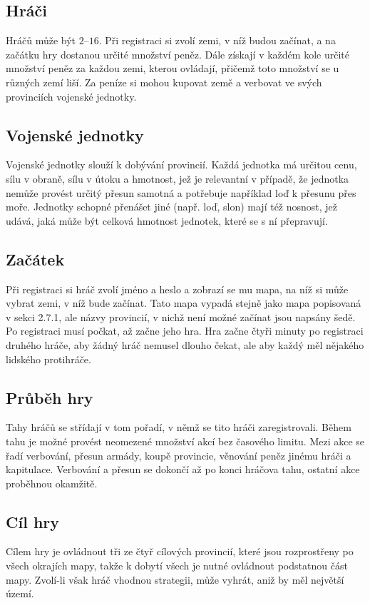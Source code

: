 \documentclass[a4paper,12pt]{article}
\begin{document}
\subsection{Hráči}
Hráčů může být $2$--$16$. Při registraci si zvolí zemi, v níž budou začínat, a na začátku hry dostanou určité množství peněz. Dále získají v každém kole určité množství peněz za každou zemi, kterou ovládají, přičemž toto množství se u různých zemí liší. Za peníze si mohou kupovat země a verbovat ve svých provinciích vojenské jednotky.
\subsection{Vojenské jednotky}
Vojenské jednotky slouží k dobývání provincií. Každá jednotka má určitou cenu, sílu v obraně, sílu v útoku a hmotnost, jež je relevantní v případě, že jednotka nemůže provést určitý přesun samotná a potřebuje například loď k přesunu přes moře. Jednotky schopné přenášet jiné (např. loď, slon) mají též nosnost, jež udává, jaká může být celková hmotnost jednotek, které se s ní přepravují.
\subsection{Začátek}
Při registraci si hráč zvolí jméno a heslo a zobrazí se mu mapa, na níž si může vybrat zemi, v níž bude začínat. Tato mapa vypadá stejně jako mapa popisovaná v sekci 2.7.1, ale názvy provincií, v nichž není možné začínat jsou napsány šedě. Po registraci musí počkat, až začne jeho hra. Hra začne čtyři minuty po registraci druhého hráče, aby žádný hráč nemusel dlouho čekat, ale aby každý měl nějakého lidského protihráče.
\subsection{Průběh hry}
Tahy hráčů se střídají v tom pořadí, v němž se tito hráči zaregistrovali. Během tahu je možné provést neomezené množství akcí bez časového limitu. Mezi akce se řadí verbování, přesun armády, koupě provincie, věnování peněz jinému hráči a kapitulace. Verbování a přesun se dokončí až po konci hráčova tahu, ostatní akce proběhnou okamžitě.
\subsection{Cíl hry}
Cílem hry je ovládnout tři ze čtyř cílových provincií, které jsou rozprostřeny po všech okrajích mapy, takže k dobytí všech je nutné ovládnout podstatnou část mapy. Zvolí-li však hráč vhodnou strategii, může vyhrát, aniž by měl největší území.
\end{document}
